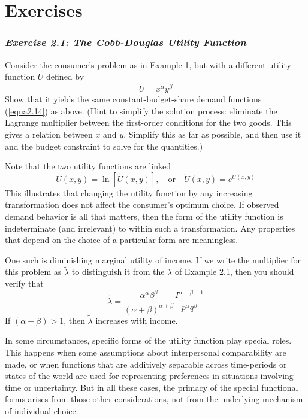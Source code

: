 \section*{Exercises}

\subsubsection*{\textit{Exercise 2.1: The Cobb-Douglas Utility Function}}

Consider the consumer's problem as in Example 1, but with a different utility function $\tilde{U}$ defined by 
\begin{equation*}
\tilde{U} = x^\alpha y^\beta
\end{equation*}
Show that it yields the same constant-budget-share demand functions (\ref{equa2.14}) as above. (Hint to simplify the solution process: eliminate the Lagrange multiplier between the first-order conditions for the two goods. This gives a relation between $x$ and $y$. Simplify this as far as possible, and then use it and the budget constraint to solve for the quantities.)

Note that the two utility functions are linked 
\begin{equation*}
U(x,y) = \ln[\tilde{U}( x, y)],  \quad \mbox{or} \quad \tilde{U}( x, y) = e^{U(x,y)}
\end{equation*}
This illustrates that changing the utility function by any increasing transformation does not affect the consumer's optimum choice. If observed demand behavior is all that matters, then the form of the utility function is indeterminate (and irrelevant) to within such a transformation. Any properties that depend on the choice of a particular form are meaningless.

One such is diminishing marginal utility of income. If we write the multiplier for this problem as $\tilde{\lambda}$ to distinguish it from the $\lambda$ of Example 2.1, then you should verify that
\begin{equation} \label{equa2.17}
\tilde{\lambda} = \dfrac{\alpha^\alpha \beta^\beta}{(\alpha+\beta)^{\alpha + \beta}} \dfrac{I^{\alpha+\beta-1}}{p^\alpha q^\beta}
\end{equation}
If $(\alpha + \beta)>1$, then $\tilde{\lambda}$ increases with income.

In some circumstances, specific forms of the utility function play special roles. This happens when some assumptions about interpersonal comparability are made, or when functions that are additively separable across time-periods or states of the world are used for representing preferences in situations involving time or uncertainty. But in all these cases, the primacy of the special functional forms arises from those other considerations, not from the underlying mechanism of individual choice.

